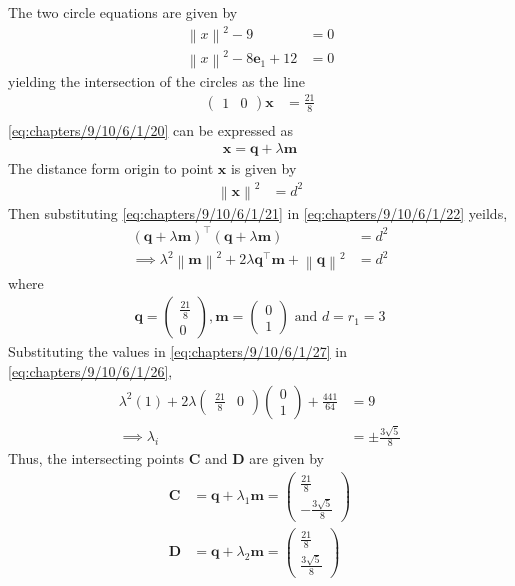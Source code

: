 \documentclass[12pt]{article}
\providecommand{\norm}[1]{\left\lVert#1\right\rVert}
\newcommand{\myvec}[1]{\ensuremath{\begin{pmatrix}#1\end{pmatrix}}}
\let\vec\mathbf
\let\vec\mathbf
\providecommand{\brak}[1]{\ensuremath{\left(#1\right)}}
\providecommand{\brak}[1]{\ensuremath{\left(#1\right)}}
\providecommand{\norm}[1]{\left\lVert#1\right\rVert}
\let\vec\mathbf
\begin{document}
\begin{table}[H]
	\small
	\centering
     
	\label{tab:chapters/9/10/6/1/table1}
\end{table}
 The two circle equations are given by
\begin{align}
\label{eq:chapters/9/10/6/1/1}
	\norm{x}^2-9&=0\\
	\norm{x}^2-8\vec{e}_1+12&=0
\end{align}
yielding the intersection of the circles as the line
\begin{align}
\myvec{1&0}\vec{x}&=\frac{21}{8}\\
\label{eq:chapters/9/10/6/1/20}
\end{align}
		\eqref{eq:chapters/9/10/6/1/20} can be expressed as
\begin{align}
	\vec{x}=\vec{q}+\lambda\vec{m}\label{eq:chapters/9/10/6/1/21}
\end{align}
The distance form origin to point $\vec{x}$ is given by
\begin{align}
	\norm{\vec{x}}^2&=d^2\label{eq:chapters/9/10/6/1/22}
\end{align}
		Then substituting \eqref{eq:chapters/9/10/6/1/21} in \eqref{eq:chapters/9/10/6/1/22} yeilds,
\begin{align}
	\brak{\vec{q}+\lambda\vec{m}}^{\top}\brak{\vec{q}+\lambda\vec{m}}&=d^2\\
	\implies \lambda^2\norm{\vec{m}}^2+2\lambda\vec{q}^{\top}\vec{m}+\norm{\vec{q}}^2&=d^2\label{eq:chapters/9/10/6/1/26}
\end{align}
where
\begin{align}
	\vec{q}=\myvec{\frac{21}{8}\\0},\vec{m}=\myvec{0\\1} \text{ and } d=r_1=3
	\label{eq:chapters/9/10/6/1/27}
\end{align}
		Substituting the values in \eqref{eq:chapters/9/10/6/1/27} in \eqref{eq:chapters/9/10/6/1/26}, 
\begin{align}
	\lambda^2(1)+2\lambda\myvec{\frac{21}{8}&0}\myvec{0\\1}+\frac{441}{64}&=9\\
	\implies\lambda_i&=\pm\frac{3\sqrt{5}}{8}
\end{align}
Thus, 
the intersecting points $\vec{C}$ and $\vec{D}$ are given by
\begin{align}
    \vec{C}&=\vec{q}+\lambda_1\vec{m}=\myvec{\frac{21}{8}\\[2pt]-\frac{3\sqrt{5}}{8}}\\
    \vec{D}&=\vec{q}+\lambda_2\vec{m}=\myvec{\frac{21}{8}\\[2pt]\frac{3\sqrt{5}}{8}}
\end{align}
\end{document}
